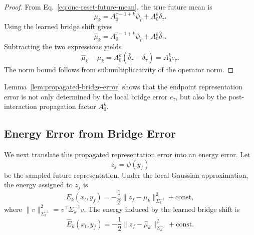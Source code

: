 \begin{proof}
From Eq.~\eqref{eq:one-reset-future-mean}, the true future mean is
\begin{equation}
    \mu_k
    =
    A_0^{\tau+1+k}\psi_t
    +
    A_0^k\delta_{\tau}.
\end{equation}
Using the learned bridge shift gives
\begin{equation}
    \widehat{\mu}_k
    =
    A_0^{\tau+1+k}\psi_t
    +
    A_0^k\widehat{\delta}_{\tau}.
\end{equation}
Subtracting the two expressions yields
\begin{equation}
    \widehat{\mu}_k-\mu_k
    =
    A_0^k
    \left(
    \widehat{\delta}_{\tau}
    -
    \delta_{\tau}
    \right)
    =
    A_0^k e_{\tau}.
\end{equation}
The norm bound follows from submultiplicativity of the operator norm.
\end{proof}

Lemma~\ref{lem:propagated-bridge-error} shows that the endpoint representation error is not only determined by the local bridge error $e_{\tau}$, but also by the post-interaction propagation factor $A_0^k$.

\subsection{Energy Error from Bridge Error}

We next translate this propagated representation error into an energy error. Let
\[
    z_f=\psi(y_f)
\]
be the sampled future representation. Under the local Gaussian approximation, the energy assigned to $z_f$ is
\begin{equation}
    E_k(x_t,y_f)
    =
    -\frac{1}{2}
    \|z_f-\mu_k\|_{\Sigma_k^{-1}}^2
    +
    \mathrm{const},
    \label{eq:gaussian-energy-appendix}
\end{equation}
where $\|v\|_{\Sigma_k^{-1}}^2 = v^\top \Sigma_k^{-1}v$. The energy induced by the learned bridge shift is
\begin{equation}
    \widehat{E}_k(x_t,y_f)
    =
    -\frac{1}{2}
    \|z_f-\widehat{\mu}_k\|_{\Sigma_k^{-1}}^2
    +
    \mathrm{const}.
\end{equation}

